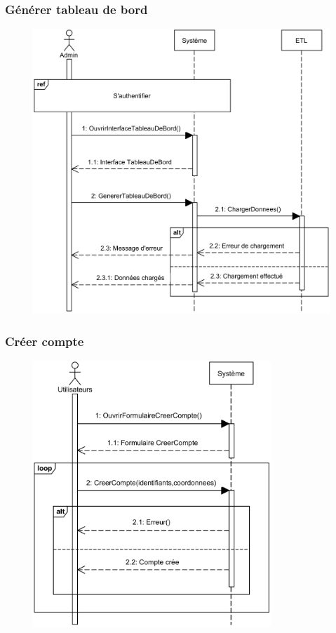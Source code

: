     \subsubsection[Générer tableau de bord]{Générer tableau de bord}
        \begin{figure}[H]
            \centering
            \includegraphics[width=130mm]{images/diagramme-de-sequence/sd-gene-dashboard.png}
            \label{fig:sdGenTab}
        \end{figure}
\pagebreak
    \subsubsection[Créer compte]{Créer compte}
        \begin{figure}[H]
            \centering
            \includegraphics[width=90mm]{images/diagramme-de-sequence/sd-compte.png}
            \label{fig:sdCreerCompte}
        \end{figure}

